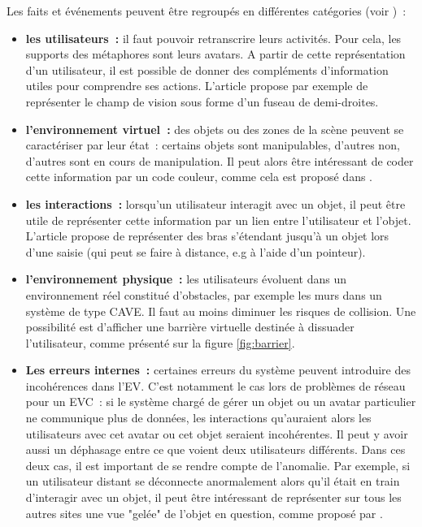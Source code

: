\documentclass[11pt]{article}
\begin{document}
Les faits et événements peuvent être regroupés en différentes catégories (voir \cite{survey})~:
\begin{itemize}
	\item \textbf{les utilisateurs~:} il faut pouvoir retranscrire leurs activités. Pour cela, les supports des métaphores sont leurs avatars. A partir de cette représentation d'un utilisateur, il est possible de donner des compléments d'information utiles pour comprendre ses actions. L'article \cite{fraser} propose par exemple de représenter le champ de vision sous forme d'un fuseau de demi-droites.
	\item \textbf{l'environnement virtuel~:} des objets ou des zones de la scène peuvent se caractériser par leur état~: certains objets sont manipulables, d'autres non, d'autres sont en cours de manipulation. Il peut alors être intéressant de coder cette information par un code couleur, comme cela est proposé dans \cite{pinho}.
	\item \textbf{les interactions~:} lorsqu'un utilisateur interagit avec un objet, il peut être utile de représenter cette information par un lien entre l'utilisateur et l'objet. L'article \cite{fraser} propose de représenter des bras s'étendant jusqu'à un objet lors d'une saisie (qui peut se faire à distance, e.g à l'aide d'un pointeur).
	\item \textbf{l'environnement physique~:} les utilisateurs évoluent dans un environnement réel constitué d'obstacles, par exemple les murs dans un système de type CAVE. Il faut au moins diminuer les risques de collision. Une possibilité est d'afficher une barrière virtuelle destinée à dissuader l'utilisateur, comme présenté sur la figure \ref{fig:barrier}.
	\item \textbf{Les erreurs internes~:} certaines erreurs du système peuvent introduire des incohérences dans l'EV. C'est notamment le cas lors de problèmes de réseau pour un EVC~: si le système chargé de gérer un objet ou un avatar particulier ne communique plus de données, les interactions qu'auraient alors les utilisateurs avec cet avatar ou cet objet seraient incohérentes. Il peut y avoir aussi un déphasage entre ce que voient deux utilisateurs différents. Dans ces deux cas, il est important de se rendre compte de l'anomalie. Par exemple, si un utilisateur distant se déconnecte anormalement alors qu'il était en train d'interagir avec un objet, il peut être intéressant de représenter sur tous les autres sites une vue "gelée" de l'objet en question, comme proposé par \cite{network-errors}.
\end{itemize}
\end{document}
